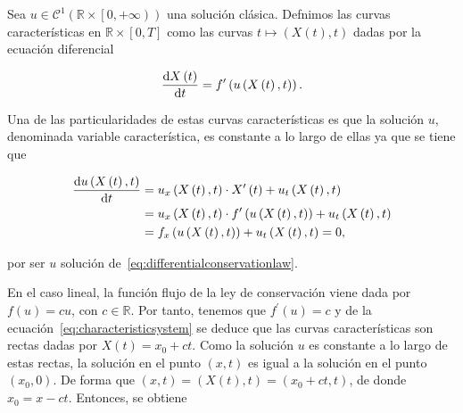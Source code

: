 \begin{definition}
  Sea
  \begin{math}
    u\in\mathcal{C}^{1}
    \left(
    \mathbb{R}\times
    \left[0,+\infty\right)
    \right)
  \end{math}
  una solución clásica.
  Defnimos las curvas características en
  \begin{math}
    \mathbb{R}\times
    \left[0,T\right]
  \end{math}
  como las curvas
  \begin{math}
    t\longmapsto
    \left(
    X\left(t\right),t
    \right)
  \end{math}
  dadas por la ecuación diferencial

  \begin{equation}\label{eq:characteristicsystem}
    \diff{X\left(t\right)}{t}=
    f^{\prime}
    \left(
    u\left(X\left(t\right),t\right)
    \right).
  \end{equation}
\end{definition}

Una de las particularidades de estas curvas características es que la
solución $u$, denominada variable característica, es constante a lo
largo de ellas ya que se tiene que

\begin{align*}
  \diff{
    u
    \left(
    X\left(t\right),t
    \right)
  }{t} & =
  u_{x}
  \left(
  X\left(t\right),t
  \right)\cdot
  X^{\prime}
  \left(t\right)+
  u_{t}
  \left(
  X\left(t\right),t
  \right)  \\
       & =
  u_{x}
  \left(
  X\left(t\right),t
  \right)\cdot
  f^{\prime}
  \left(
  u\left(X\left(t\right),t\right)
  \right)+
  u_{t}
  \left(
  X\left(t\right),t
  \right)  \\
       & =
  f_{x}
  \left(
  u\left(X\left(t\right),t\right)
  \right)+
  u_{t}
  \left(
  X\left(t\right),t
  \right)=
  0,
\end{align*}

por ser $u$ solución de~\eqref{eq:differentialconservationlaw}.

En el caso lineal, la función flujo de la ley de conservación viene
dada por $f\left(u\right)=cu$, con $c\in\mathbb{R}$.
Por tanto, tenemos que $f^{\prime}\left(u\right)=c$ y de la
ecuación~\eqref{eq:characteristicsystem} se deduce que las curvas
características son rectas dadas por $X\left(t\right)=x_{0}+ct$.
Como la solución $u$ es constante a lo largo de estas rectas, la
solución en el punto $\left(x,t\right)$ es igual a la solución en el
punto $\left(x_{0},0\right)$.
De forma que
\begin{math}
  \left(x,t\right)=
  \left(
  X\left(t\right),t
  \right)=
  \left(x_0+ct,t\right)
\end{math},
de donde $x_{0}=x-ct$.
Entonces, se obtiene

